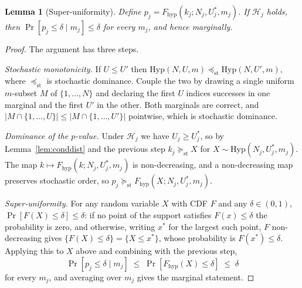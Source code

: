 \documentclass{article} %
\newtheorem{lemma}{Lemma}
\begin{document}
\begin{lemma}[Super-uniformity]
\label{lem:superunif}
Define $p_j = F_{\mathrm{hyp}}(k_j; N_j, U_j^{*}, m_j)$. If $\mathcal{H}_j$ holds, then $\Pr[p_j \le \delta \mid m_j] \le \delta$ for every $m_j$, and hence marginally.
\end{lemma}

\begin{proof}
The argument has three steps.

\emph{Stochastic monotonicity.} If $U \le U'$ then $\mathrm{Hyp}(N, U, m) \preceq_{\mathrm{st}}
\mathrm{Hyp}(N, U', m)$, where $\preceq_{\mathrm{st}}$ is stochastic dominance. Couple the two by drawing a single uniform $m$-subset $M$ of
$\{1, \dots, N\}$ and declaring the first $U$ indices successes in one marginal and the
first $U'$ in the other. Both marginals are correct, and $|M \cap \{1, \dots, U\}| \le
|M \cap \{1, \dots, U'\}|$ pointwise, which is stochastic dominance.

\emph{Dominance of the $p$-value.} Under $\mathcal{H}_j$ we have $U_j \ge U_j^{*}$, so by
Lemma~\ref{lem:conddist} and the previous step $k_j \succeq_{\mathrm{st}} X$ for $X \sim
\mathrm{Hyp}(N_j, U_j^{*}, m_j)$. The map $k \mapsto F_{\mathrm{hyp}}(k; N_j, U_j^{*},
m_j)$ is non-decreasing, and a non-decreasing map preserves stochastic order, so $p_j
\succeq_{\mathrm{st}} F_{\mathrm{hyp}}(X; N_j, U_j^{*}, m_j)$.

\emph{Super-uniformity.} For any random variable $X$ with CDF $F$ and any $\delta \in
(0,1)$, $\Pr[F(X) \le \delta] \le \delta$: if no point of the support satisfies $F(x)
\le \delta$ the probability is zero, and otherwise, writing $x^{*}$ for the largest such
point, $F$ non-decreasing gives $\{F(X) \le \delta\} = \{X \le x^{*}\}$, whose
probability is $F(x^{*}) \le \delta$. Applying this to $X$ above and combining with the
previous step, 
\[
  \Pr[p_j \le \delta \mid m_j] \;\le\; \Pr[F_{\mathrm{hyp}}(X) \le \delta] \;\le\; \delta
\]
 for every $m_j$, and averaging over $m_j$ gives the marginal statement.
\end{proof}
\end{document}
